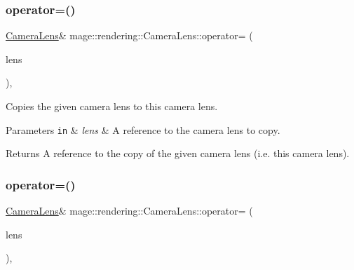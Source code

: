 \subsubsection{\texorpdfstring{operator=()}{operator=()}\hspace{0.1cm}{\footnotesize\ttfamily [1/2]}}
{\footnotesize\ttfamily \mbox{\hyperlink{classmage_1_1rendering_1_1_camera_lens}{Camera\+Lens}}\& mage\+::rendering\+::\+Camera\+Lens\+::operator= (\begin{DoxyParamCaption}\item[{const \mbox{\hyperlink{classmage_1_1rendering_1_1_camera_lens}{Camera\+Lens}} \&}]{lens }\end{DoxyParamCaption})\hspace{0.3cm}{\ttfamily [default]}, {\ttfamily [noexcept]}}

Copies the given camera lens to this camera lens.


\begin{DoxyParams}[1]{Parameters}
\mbox{\tt in}  & {\em lens} & A reference to the camera lens to copy. \\
\hline
\end{DoxyParams}
\begin{DoxyReturn}{Returns}
A reference to the copy of the given camera lens (i.\+e. this camera lens). 
\end{DoxyReturn}
\mbox{\label{classmage_1_1rendering_1_1_camera_lens_a09ce42a5b033def0baec29b7ac9483d2}} 
\subsubsection{\texorpdfstring{operator=()}{operator=()}\hspace{0.1cm}{\footnotesize\ttfamily [2/2]}}
{\footnotesize\ttfamily \mbox{\hyperlink{classmage_1_1rendering_1_1_camera_lens}{Camera\+Lens}}\& mage\+::rendering\+::\+Camera\+Lens\+::operator= (\begin{DoxyParamCaption}\item[{\mbox{\hyperlink{classmage_1_1rendering_1_1_camera_lens}{Camera\+Lens}} \&\&}]{lens }\end{DoxyParamCaption})\hspace{0.3cm}{\ttfamily [default]}, {\ttfamily [noexcept]}}

